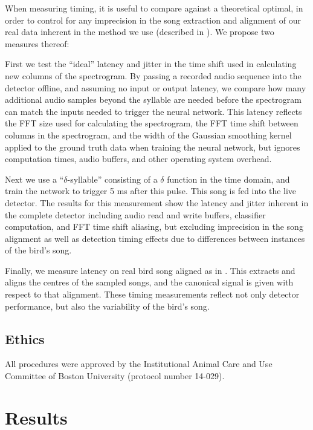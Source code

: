 \documentclass[10pt,letterpaper]{article}
\begin{document}
When measuring timing, it is useful to compare against a theoretical
optimal, in order to control for any imprecision in the song
extraction and alignment of our real data inherent in the method we
use (described in \cite{Poole2012}).  We propose two measures thereof:

First we test the ``ideal'' latency and jitter in the time shift used
in calculating new columns of the spectrogram. By passing a recorded
audio sequence into the detector offline, and assuming no input or
output latency, we compare how many additional audio samples beyond
the syllable are needed before the spectrogram can match the inputs
needed to trigger the neural network.  This latency reflects the FFT
size used for calculating the spectrogram, the FFT time shift between
columns in the spectrogram, and the width of the Gaussian smoothing
kernel applied to the ground truth data when training the neural
network, but ignores computation times, audio buffers, and other
operating system overhead.

Next we use a ``$\delta$-syllable'' consisting of a $\delta$ function
in the time domain, and train the network to trigger 5 ms after this
pulse.  This song is fed into the live detector.  The results for this
measurement show the latency and jitter inherent in the complete
detector including audio read and write buffers, classifier
computation, and FFT time shift aliasing, but excluding imprecision in
the song alignment as well as detection timing effects due to
differences between instances of the bird's song.

Finally, we measure latency on real bird song aligned as in
\cite{Poole2012}.  This extracts and aligns the centres of the sampled
songs, and the canonical signal is given with respect to that
alignment.  These timing measurements reflect not only detector
performance, but also the variability of the bird's song.

\subsection{Ethics}

All procedures were approved by the Institutional Animal Care and Use
Committee of Boston University (protocol number 14-029).

\section{Results}
\label{sec:results}
\end{document}
